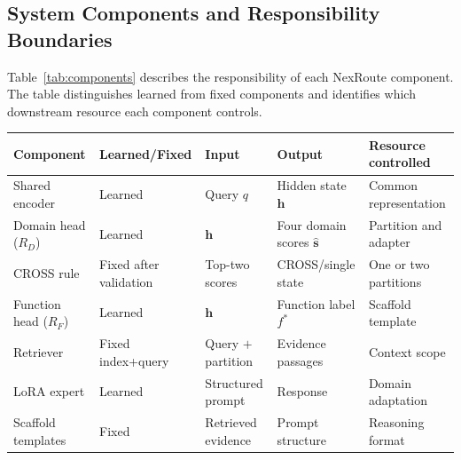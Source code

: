 \documentclass[a4paper,fleql,doubleblind]{cas-sc}
\begin{document}
\subsection{System Components and Responsibility Boundaries}
\label{ssec:components}

Table~\ref{tab:components} describes the responsibility of each NexRoute component.
The table distinguishes learned from fixed components and identifies which downstream
resource each component controls.

\vspace{4pt}
\begin{center}
\begingroup
\renewcommand{\arraystretch}{1.25}
\label{tab:components}
\small
\begin{tabular}{l l l l l}
\toprule
\textbf{Component} & \textbf{Learned/Fixed} & \textbf{Input} & \textbf{Output} & \textbf{Resource controlled} \\
\midrule
Shared encoder & Learned & Query $q$ & Hidden state $\mathbf{h}$ & Common representation \\
Domain head ($R_D$) & Learned & $\mathbf{h}$ & Four domain scores $\hat{\mathbf{s}}$ & Partition and adapter \\
CROSS rule & Fixed after validation & Top-two scores & CROSS/single state & One or two partitions \\
Function head ($R_F$) & Learned & $\mathbf{h}$ & Function label $f^*$ & Scaffold template \\
Retriever & Fixed index+query & Query $+$ partition & Evidence passages & Context scope \\
LoRA expert & Learned & Structured prompt & Response & Domain adaptation \\
Scaffold templates & Fixed & Retrieved evidence & Prompt structure & Reasoning format \\
\bottomrule
\end{tabular}
\endgroup
\end{center}
\vspace{4pt}

\end{document}
